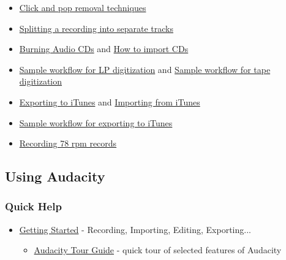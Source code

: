 \begin{multicols}{2}
\begin{itemize}
\item 
\hyperref[\foo{man:tutorial:click:and:pop:removal:techniques:}]{Click and pop removal techniques}

\item 
\hyperref[\foo{man:splitting:a:recording:into:separate:tracks:}]{Splitting a recording into separate tracks}

\item 
\hyperref[\foo{man:burning:music:files:to:a:cd:}]{Burning Audio CDs}
 and 
\hyperref[\foo{man:tutorial:how:to:import:cds:}]{How to import CDs}

\item 
\hyperref[\foo{man:sample:workflow:for:lp:digitization:}]{Sample workflow for LP digitization}
 and 
\hyperref[\foo{man:sample:workflow:for:tape:digitization:}]{Sample workflow for tape digitization}

\end{itemize}

\begin{itemize}
\item 
\hyperref[\foo{man:tutorial:exporting:to:itunes:}]{Exporting to iTunes}
 and 
\hyperref[\foo{man:tutorial:how:to:import:files:from:itunes:}]{Importing from iTunes}

\item 
\hyperref[\foo{man:sample:workflow:for:exporting:to:itunes:}]{Sample workflow for exporting to iTunes}

\end{itemize}

\begin{itemize}
\item 
\hyperref[\foo{man:recording:78:rpm:records:}]{Recording 78 rpm records}

\end{itemize}

\label{index:bottom:using}
\subsection{Using Audacity}
\label{index:using}
\subsubsection{Quick Help}
\begin{itemize}
\item 
\hyperref[\foo{quick:help:}]{Getting Started}
 - Recording, Importing, Editing, Exporting...

\begin{itemize}
\item 
\hyperref[\foo{man:audacity:tour:guide:}]{Audacity Tour Guide}
 - quick tour of selected features of Audacity
\end{itemize}


\end{itemize}
\end{multicols}
